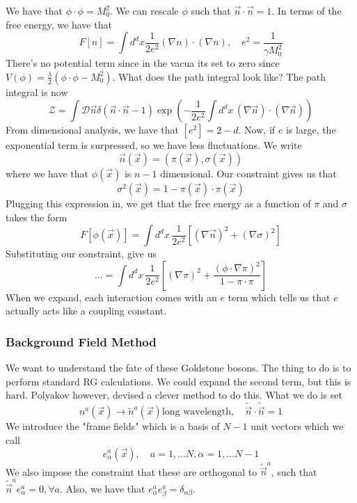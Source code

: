 We have that $ \phi \cdot  \phi  = M_0 ^ 2 $. We can 
rescale $ \phi $ such that $ \vec{n} \cdot  \vec{n} = 1 $. 
In terms of the free energy, 
we have that 
\[
F [ n ] = \int d ^ d x \frac{1}{2 e ^ 2 } ( \nabla n ) \cdot  ( \nabla n )  , \quad e ^ 2 =  \frac{1}{\gamma M_0 ^ 2 } 
\]  There's no potential term 
since in the vacua its set to zero since 
$V ( \phi ) = \frac{\lambda }{ 2 } ( \phi \cdot  \phi - M_0 ^ 2 ) $. 
What does the path integral look like? 
The path integral is now 
\[
\mathcal{ Z } = \int \mathcal{ D } \vec{n} \delta ( \vec{n} \cdot  \vec{n} -1 ) \exp \left( 
- \frac{1}{2 e ^ 2 } \int d ^ d x \, ( \nabla \vec{n} ) \cdot  ( \nabla \vec{n} ) \right) 
\] From dimensional analysis, we have that $ \left[  e ^ 2  \right]   = 2 - d $. 
Now, if $ e $ is large, the exponential term is surpressed, 
so we have less fluctuations. 
We write 
\[
\vec{n} ( \vec{x} ) = \left(  \pi ( \vec{x} ) , \sigma ( \vec{x} )  \right) 
\] where we have that $ \phi  ( \vec{x} )  $ is $ n - 1  $ dimensional. 
Our constraint gives us that 
\[
\sigma ^ 2 ( \vec{x} )  = 1 - \pi ( \vec{x} ) \cdot \pi ( \vec{x} ) 
\] Plugging this expression in, we get that 
the free energy as a function of $ \pi $ and $ \sigma $ takes the 
form 
\[
F \left[  \phi ( \vec{x} )  \right]  = \int d ^ d x \, 
\frac{1}{2 e ^ 2 } \left[  ( \nabla \vec{n} ) ^ 2 + ( \nabla \sigma ) ^ 2  \right] 
\] Substituting our constraint, give us 
\[
\dots = \int d ^ d x \, \frac{1}{2 e ^ 2 } \left[  
( \nabla \pi ) ^ 2 + \frac{( \phi \cdot  \nabla \pi) ^ 2 }{ 1- \pi \cdot  \pi }\right] 
\] When we expand, each interaction comes with an $ e $ term 
which tells us that $ e  $ actually acts like a coupling constant. 

\subsubsection{Background Field Method} 
We want to understand the fate of these Goldstone bosons. 
The thing to do is to perform standard RG calculations.
We could expand the second term, but this is hard. 
Polyakov however, devised a clever method to do this. 
What we do is set 
\[
n ^ a ( \vec{x} ) \to \tilde{ n } ^ a ( \vec{x} ) \text{long wavelength}  ,\quad \tilde{ \vec{n}   } \cdot \tilde{ \vec{n}} = 1  
\] We introduce the "frame fields" 
which is a basis of $ N - 1$ unit vectors which we call 
\[
e ^ a_ \alpha ( \vec{x} ) , \quad a  = 1, \dots N, \alpha = 1, \dots N - 1
\] We also impose the constraint that these are orthogonal to 
$ \tilde{ \vec{n} }  ^ a  $, such that $ \tilde{ \vec{n} } ^ a e ^ a _ \alpha = 0 , \forall a $. 
Also, we have that $ e ^ a _ \alpha e ^ a _{ \beta }  = \delta _{ \alpha \beta } $. 

